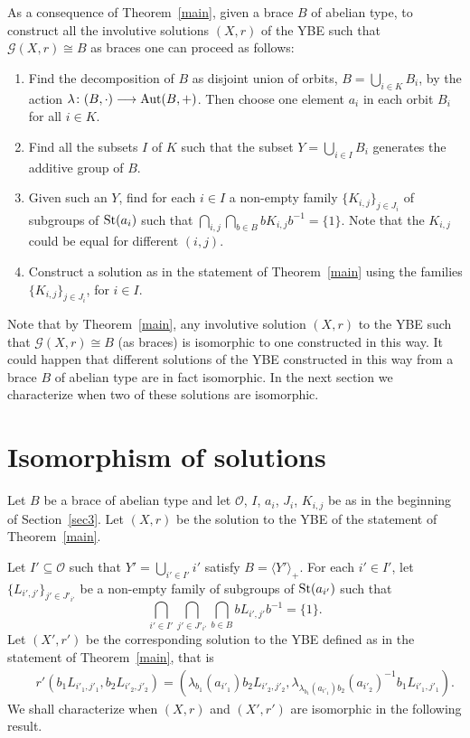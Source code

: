 As a consequence of Theorem~\ref{main}, given a brace $B$ of abelian type, to
construct all the involutive solutions $(X,r)$ of the YBE such that
$\mathcal{G}(X,r)\cong B$ as braces one can proceed as follows:
\begin{enumerate}
	\item Find the decomposition of $B$ as disjoint union of orbits, $B=\bigcup_{i\in K} B_i$, by the action $\lambda\colon (B,\cdot)\longrightarrow\operatorname{Aut}(B,+)$.
	Then choose one element $a_i$ in each orbit $B_i$ for all $i\in K$.
	
	\item Find all the subsets $I$ of $K$ such that the subset
	$Y=\bigcup_{i\in I}B_i$ generates the additive group of $B$.
	
	\item Given such an $Y$, find for each $i\in I$ a non-empty family $\{K_{i,j}\}_{j\in
		J_i}$ of subgroups of $\operatorname{St}(a_i)$ such that $\bigcap_{i,j}
	\bigcap_{b\in B}bK_{i,j}b^{-1}=\{ 1\}$. Note that the $K_{i,j}$
	could be equal for different $(i,j)$.
	
	\item Construct a solution as in the statement of
	Theorem~\ref{main} using the families $\{K_{i,j}\}_{j\in J_i}$, for
	$i\in I$.
\end{enumerate}

Note that by Theorem~\ref{main}, any involutive solution $(X,r)$ to the YBE
such that $\mathcal{G}(X,r)\cong B$  (as braces) is isomorphic
to one constructed in this way. It could happen that different
solutions of the YBE constructed in this way from a brace $B$ of abelian type
are in fact isomorphic. In the next section we characterize when two
of these solutions are isomorphic.



\section{Isomorphism of solutions}
Let $B$ be a brace of abelian type and let $\mathcal{O}$, $I$, $a_i$, $J_i$,
$K_{i,j}$ be as in the beginning of Section~\ref{sec3}. Let $(X,r)$
be the solution to the YBE of the statement of Theorem~\ref{main}.

Let $I'\subseteq \mathcal{O}$ such that $Y'=\bigcup_{i'\in I'}i'$
satisfy $B=\langle Y'\rangle_+$. For each $i'\in I'$, let $\{
L_{i',j'} \}_{j'\in J'_{i'}}$ be a non-empty family of subgroups of
$\operatorname{St}(a_{i'})$ such that
$$\bigcap_{i'\in I'}\bigcap_{j'\in J'_{i'}}\bigcap_{b\in B}bL_{i',j'}b^{-1}=\{ 1\}.$$
Let $(X',r')$ be the corresponding solution to the YBE defined as in
the statement of Theorem~\ref{main}, that is
\begin{eqnarray*}
	&&r'(b_1L_{i'_1,j'_1},b_2L_{i'_2,j'_2})=(\lambda_{b_1}(a_{i'_1})b_2L_{i'_2,j'_2},\lambda_{\lambda_{b_1}(a_{i'_1})b_2}(a_{i'_2})^{-1}b_1L_{i'_1,j'_1}).
\end{eqnarray*}
We shall characterize when $(X,r)$ and $(X',r')$ are isomorphic in
the following result.

